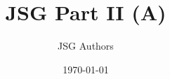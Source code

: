 \documentclass[11pt]{article}
\title{JSG Part II (A)}
\author{JSG Authors}
\date{\today}
\begin{document}
\maketitle

\newcommand{\JSGWrap}{A}















\nocite{*}
\printbibliography
\end{document}
